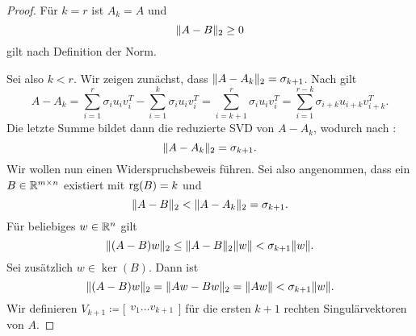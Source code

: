 \begin{proof}
    Für \(k=r\) ist \(A_{k}=A\) und 
    \begin{equation*}
        \lVert A-B\rVert_{2} \geq 0
    \end{equation*}
    gilt nach Definition der Norm. 

    Sei also \(k < r\).
    Wir zeigen zunächst, dass \(\lVert A-A_{k}\rVert_{2} = \sigma_{k+1}\).
    Nach  gilt
    \begin{equation*}
        A-A_{k} = \sum_{i=1}^{r}\sigma_{i}u_{i}v_{i}^{T} - \sum_{i=1}^{k}\sigma_{i}u_{i}v_{i}^{T} = \sum_{i=k+1}^{r}\sigma_{i}u_{i}v_{i}^{T}=\sum_{i=1}^{r-k}\sigma_{i+k}u_{i+k}v_{i+k}^{T}.
    \end{equation*}
    Die letzte Summe bildet dann die reduzierte SVD von \(A-A_{k}\), wodurch nach : 
    \begin{equation*}
        \lVert A-A_{k}\rVert_{2} = \sigma_{k+1}.
    \end{equation*}
    Wir wollen nun einen Widerspruchsbeweis führen.
    Sei also angenommen, dass ein \(B \in \mathbb{R}^{m \times n}\) existiert mit \(\operatorname{rg}(B)=k\) und 
    \begin{equation*}
        \lVert A-B\rVert_{2} < \lVert A-A_{k}\rVert_{2} = \sigma_{k+1}.
    \end{equation*}
    Für beliebiges \(w \in \mathbb{R}^{n}\) gilt
    \begin{equation*}
        \lVert(A-B)w\rVert_{2} \leq \lVert A-B\rVert_{2}\lVert w\rVert < \sigma_{k+1}\lVert w\rVert.
    \end{equation*}  
    Sei zusätzlich \(w \in \ker(B)\). Dann ist 
    \begin{equation}
        \lVert(A-B)w\rVert_{2} = \lVert Aw-Bw\rVert_{2} = \lVert Aw\rVert < \sigma_{k+1}\lVert w\rVert \label{eq:eck1}.
    \end{equation}
    Wir definieren \(V_{k+1} \coloneqq 
    \big[
        \begin{matrix}
            v_{1} \ldots v_{k+1}
        \end{matrix}
    \big]
    \) 
    für die ersten \(k+1\) rechten Singulärvektoren von \(A\).
    

\end{proof}
